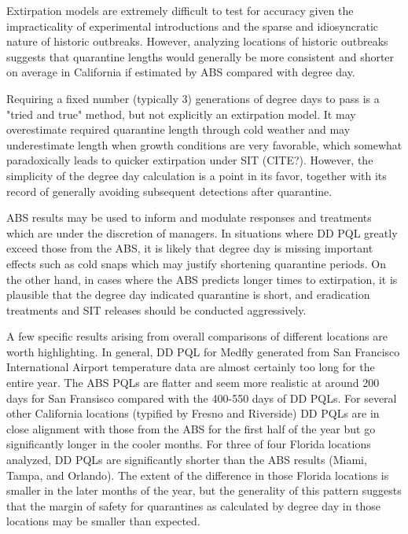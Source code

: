 \documentclass[10pt,a4paper,twocolumn]{article}
\begin{document}

Extirpation models are extremely difficult to test for accuracy given 
the impracticality of experimental introductions and 
the sparse and idiosyncratic nature of historic outbreaks. However, analyzing locations
of historic outbreaks suggests that quarantine lengths would generally be more consistent
and shorter on average in California if estimated by ABS compared with degree day. 

Requiring a fixed number (typically 3) generations of degree days to pass is 
a "tried and true" method, but not explicitly an extirpation model.
It may overestimate required quarantine length through cold weather\cite{??}
and may underestimate length when growth conditions are very favorable, 
which somewhat paradoxically leads to quicker extirpation under SIT (CITE?).
However, the simplicity of the degree day calculation is a point in its favor, together with 
its record of generally avoiding subsequent detections after quarantine\cite{mcinnis2017can}.

ABS results may be used to inform and modulate responses and treatments which are under
the discretion of managers.
In situations where DD PQL greatly exceed those from the ABS, it is likely
that degree day is missing important effects such as cold snaps which may justify
shortening quarantine periods.
On the other hand, in cases where the ABS predicts longer times to extirpation, it
is plausible that the degree day indicated quarantine is short, and 
eradication treatments and SIT releases should be conducted aggressively.


A few specific results arising from overall comparisons of different locations are worth highlighting. 
In general, DD PQL for Medfly 
generated from San Francisco International Airport temperature data
 are almost certainly too long for the entire year.
The ABS PQLs are flatter and seem more realistic at around 200 days for San
Fransisco compared with the 400-550 days of DD PQLs. 
For several other California locations (typified by Fresno and 
Riverside) DD PQLs are in close alignment with those from the ABS 
for the first half of the year 
but go significantly longer in the cooler months. 
For three of four Florida locations analyzed, 
DD PQLs are significantly shorter than the ABS results
 (Miami, Tampa, and Orlando).
The extent of the difference in those Florida locations is smaller in the later months of the year,
but the generality of this pattern suggests that the margin of safety for quarantines as 
calculated by degree day in those locations may be smaller than expected. 
\end{document}
